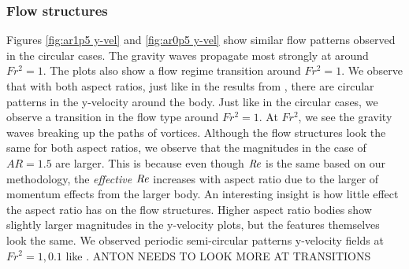 \subsubsection{Flow structures}
Figures \ref{fig:ar1p5 y-vel} and \ref{fig:ar0p5 y-vel} show similar flow patterns observed in the circular cases. The gravity waves propagate most strongly at around $Fr^2 = 1$. The plots also show a flow regime transition around $Fr^2 = 1$. We observe that with both aspect ratios, just like in the results from \cite{ortiz-tarin_stratified_2019}, there are circular patterns in the y-velocity around the body. Just like in the circular cases, we observe a transition in the flow type around $Fr^2 = 1$. At $Fr^2$, we see the gravity waves breaking up the paths of vortices.  Although the flow structures look the same for both aspect ratios, we observe that the magnitudes in the case of $AR = 1.5$ are larger. This is because even though $\mathit{Re}$ is the same based on our methodology, the \textit{effective} $\mathit{Re}$ increases with aspect ratio due to the larger of momentum effects from the larger body. An interesting insight is how little effect the aspect ratio has on the flow structures. Higher aspect ratio bodies show slightly larger magnitudes in the y-velocity plots, but the features themselves look the same. We observed periodic semi-circular patterns y-velocity fields at $Fr^2 = 1, 0.1$ like \cite{ortiz-tarin_stratified_2019} . ANTON NEEDS TO LOOK MORE AT TRANSITIONS
